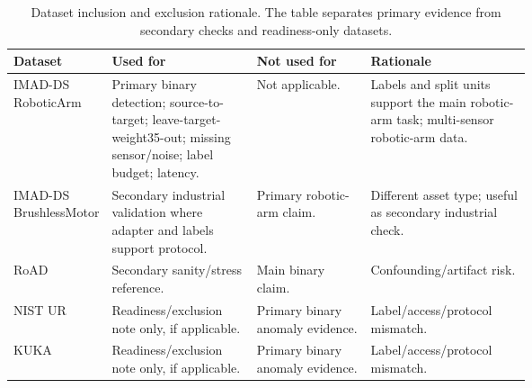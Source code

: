 \begin{table}[!htbp]
\centering
\scriptsize
\setlength{\tabcolsep}{3pt}
\renewcommand{\arraystretch}{1.08}
\caption{Dataset inclusion and exclusion rationale. The table separates primary evidence from secondary checks and readiness-only datasets.}
\label{tab:dataset-rationale}
\label{tab:dataset-inclusion}
\begin{tabularx}{\linewidth}{@{}>{\RaggedRight\arraybackslash}p{0.17\linewidth}>{\RaggedRight\arraybackslash}p{0.28\linewidth}>{\RaggedRight\arraybackslash}p{0.22\linewidth}>{\RaggedRight\arraybackslash}X@{}}
\toprule
Dataset & Used for & Not used for & Rationale \\
\midrule
IMAD-DS RoboticArm & Primary binary detection; source-to-target; leave-target-weight35-out; missing sensor/noise; label budget; latency. & Not applicable. & Labels and split units support the main robotic-arm task; multi-sensor robotic-arm data. \\
IMAD-DS BrushlessMotor & Secondary industrial validation where adapter and labels support protocol. & Primary robotic-arm claim. & Different asset type; useful as secondary industrial check. \\
RoAD & Secondary sanity/stress reference. & Main binary claim. & Confounding/artifact risk. \\
NIST UR & Readiness/exclusion note only, if applicable. & Primary binary anomaly evidence. & Label/access/protocol mismatch. \\
KUKA & Readiness/exclusion note only, if applicable. & Primary binary anomaly evidence. & Label/access/protocol mismatch. \\
\bottomrule
\end{tabularx}
\end{table}
